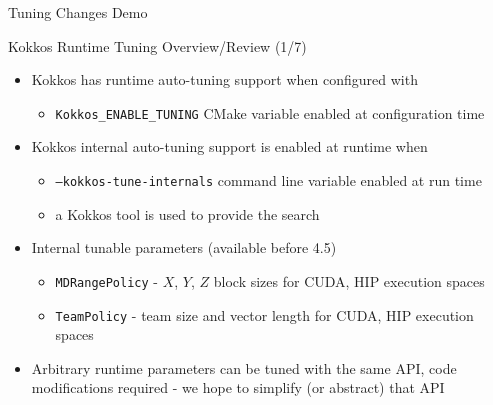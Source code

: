 
\begin{frame}[fragile]

  {\Huge Tuning Changes Demo}

  \vspace{10pt}

\end{frame}




\begin{frame}[fragile]{Kokkos Runtime Tuning Overview/Review (1/7)}
  \begin{itemize}
      \item Kokkos has runtime auto-tuning support when configured with
      \begin{itemize}
        \item \texttt{Kokkos\_ENABLE\_TUNING} CMake variable enabled at configuration time
      \end{itemize}
      \item Kokkos internal auto-tuning support is enabled at runtime when
      \begin{itemize}
        \item \texttt{--kokkos-tune-internals} command line variable enabled at run time
        \item a Kokkos tool is used to provide the search
      \end{itemize}
      \item Internal tunable parameters (available before 4.5)
      \begin{itemize}
        \item \texttt{MDRangePolicy} - $X$, $Y$, $Z$ block sizes for CUDA, HIP execution spaces
        \item \texttt{TeamPolicy} - team size and vector length for CUDA, HIP execution spaces
      \end{itemize}
      \item Arbitrary runtime parameters can be tuned with the same API, code modifications required - we hope to simplify (or abstract) that API
  \end{itemize}
\end{frame}

